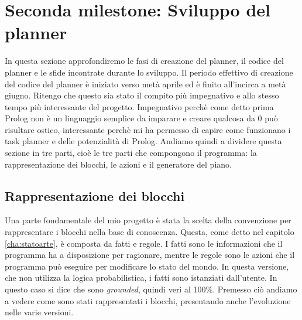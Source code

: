 \section{Seconda milestone: Sviluppo del planner}
\label{sec:sviluppoplanner}
In questa sezione approfondiremo le fasi di creazione del planner, il codice del planner e le sfide incontrate durante lo sviluppo.
Il periodo effettivo di creazione del codice del planner è iniziato verso metà aprile ed è finito all'incirca a metà giugno. Ritengo che questo sia stato il compito più impegnativo e allo stesso tempo più interessante del progetto.
Impegnativo perchè come detto prima Prolog non è un linguaggio semplice da imparare e creare qualcosa da 0 può risultare ostico, interessante perchè mi ha permesso di capire come funzionano i task planner e delle potenzialità di Prolog.
Andiamo quindi a dividere questa sezione in tre parti, cioè le tre parti che compongono il programma: la rappresentazione dei blocchi, le azioni e il generatore del piano.

\subsection{Rappresentazione dei blocchi}
\label{subsec:rapprblocchi}
Una parte fondamentale del mio progetto è stata la scelta della convenzione per rappresentare i blocchi nella base di conoscenza. Questa, come detto nel capitolo \ref{cha:statoarte}, è composta da fatti e regole. I fatti sono le informazioni che il programma ha a disposizione per ragionare, mentre le regole sono le azioni che il programma può eseguire per modificare lo stato del mondo.
In questa versione, che non utilizza la logica probabilistica, i fatti sono istanziati dall'utente. In questo caso si dice che sono \textit{grounded}, quindi veri al 100\%.
Premesso ciò andiamo a vedere come sono stati rappresentati i blocchi, presentando anche l'evoluzione nelle varie versioni.

